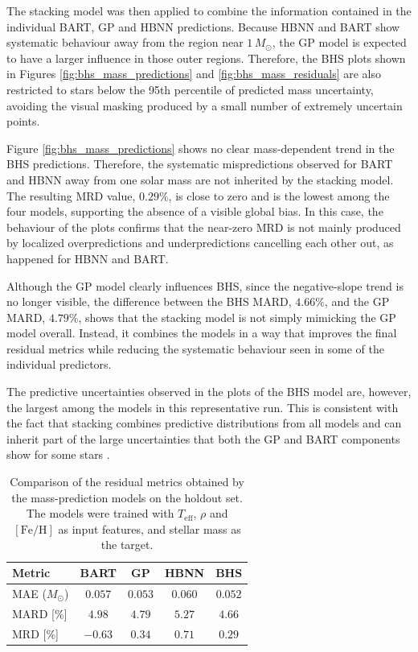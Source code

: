 The stacking model was then applied to combine the information contained in the individual BART, GP and HBNN predictions. Because HBNN and BART show systematic behaviour away from the region near $1\,M_\odot$, the GP model is expected to have a larger influence in those outer regions. Therefore, the BHS plots shown in Figures \ref{fig:bhs_mass_predictions} and \ref{fig:bhs_mass_residuals} are also restricted to stars below the 95th percentile of predicted mass uncertainty, avoiding the visual masking produced by a small number of extremely uncertain points.

Figure \ref{fig:bhs_mass_predictions} shows no clear mass-dependent trend in the BHS predictions. Therefore, the systematic mispredictions observed for BART and HBNN away from one solar mass are not inherited by the stacking model. The resulting MRD value, $0.29\%$, is close to zero and is the lowest among the four models, supporting the absence of a visible global bias. In this case, the behaviour of the plots confirms that the near-zero MRD is not mainly produced by localized overpredictions and underpredictions cancelling each other out, as happened for HBNN and BART.

Although the GP model clearly influences BHS, since the negative-slope trend is no longer visible, the difference between the BHS MARD, $4.66\%$, and the GP MARD, $4.79\%$, shows that the stacking model is not simply mimicking the GP model overall. Instead, it combines the models in a way that improves the final residual metrics while reducing the systematic behaviour seen in some of the individual predictors.

The predictive uncertainties observed in the plots of the BHS model are, however, the largest among the models in this representative run. This is consistent with the fact that stacking combines predictive distributions from all models and can inherit part of the large uncertainties that both the GP and BART components show for some stars \citep{yao2022hierarchicalstacking}.

\begin{table}[H]
\centering
\caption{Comparison of the residual metrics obtained by the mass-prediction models on the holdout set. The models were trained with $T_{\mathrm{eff}}$, $\rho$ and $[\mathrm{Fe}/\mathrm{H}]$ as input features, and stellar mass as the target.}
\label{tab:model_mard_mrd}
\begin{tabular}{lcccc}
\hline\hline
Metric & BART & GP & HBNN & BHS \\
\hline
MAE ($M_\odot$) & $0.057$ & $0.053$ & $0.060$ & $0.052$ \\
MARD [\%] & $4.98$ & $4.79$ & $5.27$ & $4.66$ \\
MRD [\%]  & $-0.63$ & $0.34$ & $0.71$ & $0.29$ \\
\hline
\end{tabular}
\end{table}

